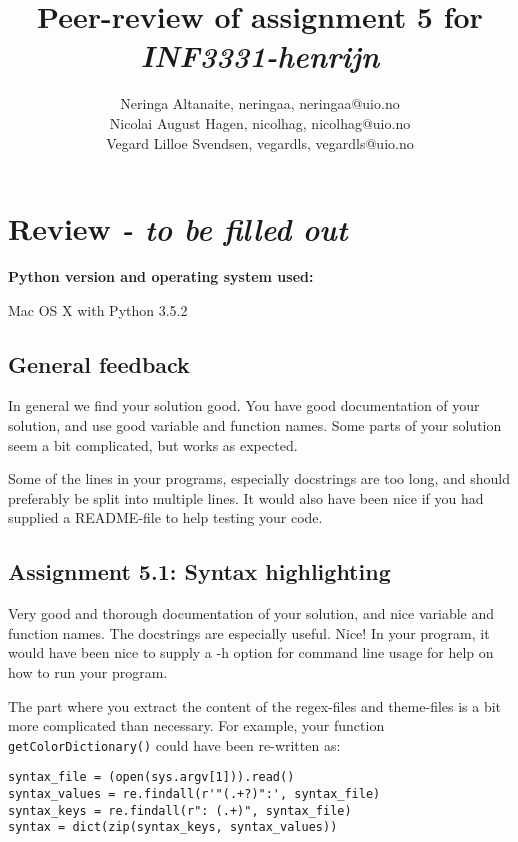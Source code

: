 \documentclass[a4paper]{article}
\title{Peer-review of assignment 5 for \textit{INF3331-henrijn}}
\author{Neringa Altanaite, neringaa, {neringaa@uio.no} \\
 		Nicolai August Hagen, nicolhag, {nicolhag@uio.no} \\
		Vegard Lilloe Svendsen, vegardls, {vegardls@uio.no}}
\begin{document}
\maketitle

\section{Review \emph{- to be filled out}}\label{sec:review}

\textbf{Python version and operating system used:}

Mac OS X with Python 3.5.2

\subsection*{General feedback}
In general we find your solution good. You have good documentation of your solution, and use good variable and function names. Some parts of your solution seem a bit complicated, but works as expected. 

Some of the lines in your programs, especially docstrings are too long, and should preferably be split into multiple lines. It would also have been nice if you had supplied a README-file to help testing your code. 

\subsection*{Assignment 5.1: Syntax highlighting}

Very good and thorough documentation of your solution, and nice variable and function names. The docstrings are especially useful. Nice! In your program, it would have been nice to supply a -h option for command line usage for help on how to run your program.

The part where you extract the content of the regex-files and theme-files is a bit more complicated than necessary. For example, your function \texttt{getColorDictionary()} could have been re-written as:

\begin{verbatim}
syntax_file = (open(sys.argv[1])).read()
syntax_values = re.findall(r'"(.+?)":', syntax_file)
syntax_keys = re.findall(r": (.+)", syntax_file)
syntax = dict(zip(syntax_keys, syntax_values))
\end{verbatim}
\end{document}

